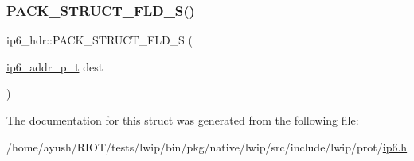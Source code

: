 \mbox{\label{structip6__hdr_a811301a2309cec8d73a5d79fb5d45578}} 
\subsubsection{\texorpdfstring{P\+A\+C\+K\+\_\+\+S\+T\+R\+U\+C\+T\+\_\+\+F\+L\+D\+\_\+\+S()}{PACK\_STRUCT\_FLD\_S()}\hspace{0.1cm}{\footnotesize\ttfamily [4/4]}}
{\footnotesize\ttfamily ip6\+\_\+hdr\+::\+P\+A\+C\+K\+\_\+\+S\+T\+R\+U\+C\+T\+\_\+\+F\+L\+D\+\_\+S (\begin{DoxyParamCaption}\item[{\hyperlink{native_2lwip_2src_2include_2lwip_2prot_2ip6_8h_a560932a657f17ec5a0a3a78a1ce7e60a}{ip6\+\_\+addr\+\_\+p\+\_\+t}}]{dest }\end{DoxyParamCaption})}



The documentation for this struct was generated from the following file\+:\begin{DoxyCompactItemize}
\item 
/home/ayush/\+R\+I\+O\+T/tests/lwip/bin/pkg/native/lwip/src/include/lwip/prot/\hyperlink{native_2lwip_2src_2include_2lwip_2prot_2ip6_8h}{ip6.\+h}\end{DoxyCompactItemize}
